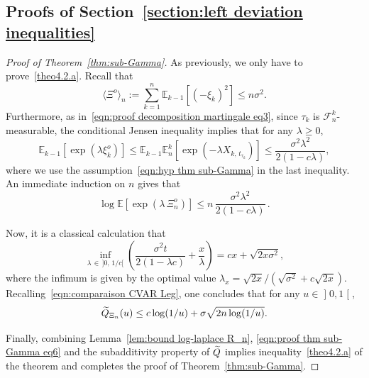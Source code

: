 \documentclass[10pt]{amsart}
\theoremstyle{definition}\newtheorem{defi}[theo]{Definition}\newtheorem{rema}[theo]{Remark}\newtheorem{exam}[theo]{Example}\newtheorem{exem}[theo]{Example}\newtheorem{nota}[theo]{Notation}
\newcommand{\bE}{\mathbb{E}}
\newcommand{\cF}{\mathcal{F}}
\newcommand{\intervalleoo}[2]{\mathopen{]} #1\mathclose{}\mathpunct{},#2\mathclose{[}}
\let\oldtilde\tilde
\renewcommand*{\tilde}[1]{\mathchoice{\widetilde{#1}}{\widetilde{#1}}{\oldtilde{#1}}{\oldtilde{#1}}}
\begin{document}
\subsection{Proofs of Section~\ref{section:left deviation inequalities}}
\begin{proof}[Proof of Theorem~\ref{thm:sub-Gamma}] As previously, we only have to prove~\eqref{theo4.2.a}.
Recall that
\begin{equation}\label{eqn:proof thm sub-Gamma eq1}
\langle\Xi^o\rangle_n:=\sum_{k=1}^n\bE_{k-1}\left[(-\xi_k)^{2}\right]\leq n\sigma^2.
\end{equation}
Furthermore, as in~\eqref{eqn:proof decomposition martingale eq3}, since $\tau_k$ is $\cF_n^k$-measurable, the conditional Jensen inequality implies that for any $\lambda\geq 0$,
\begin{equation}\label{eqn:proof thm sub-Gamma eq2}
\bE_{k-1}\left[\exp(\lambda\xi_k^o)\right]\leq \bE_{k-1}\bE _n^k\left[\exp\left(-\lambda X_{k,\,t_{\tau_k}}\right)\right]\leq\frac{\sigma^2\lambda^2}{2(1-c\lambda)},
\end{equation}
where we use the assumption~\eqref{eqn:hyp thm sub-Gamma} in the last inequality. An immediate induction on $n$ gives that
\begin{equation}\label{eqn:proof thm sub-Gamma eq4}
\log\bE\left[\exp(\lambda\,\Xi_n^o)\right]\leq n\,\frac{\sigma^2\lambda^2}{2(1-c\lambda)}\,.
\end{equation}


Now, it is a classical calculation that
\begin{equation}\label{eqn:proof thm sub-Gamma eq5}
\inf_{\lambda\,\in\,]0,\,1/c[}\left(\frac{\sigma^2 t}{2(1-\lambda c)}+\frac x\lambda\right)=cx+\sqrt{2x\sigma^2},
\end{equation}
where the infimum is given by the optimal value $\lambda_x=\sqrt{2x}/(\sqrt{\sigma^2}+c\sqrt{2x})$. Recalling~\eqref{eqn:comparaison CVAR Leg}, one concludes that for any $u\in\intervalleoo 01$,
\begin{equation}\label{eqn:proof thm sub-Gamma eq6}
\tilde Q_{\Xi_n}(u)\leq c\log(1/u)+\sigma\sqrt{2n\log(1/u)}.
\end{equation}


Finally, combining Lemma~\ref{lem:bound log-laplace R_n}, \eqref{eqn:proof thm sub-Gamma eq6} and the subadditivity property of $\tilde Q$ implies inequality~\eqref{theo4.2.a} of the theorem and completes the proof of Theorem~\ref{thm:sub-Gamma}.
\end{proof}
\end{document}
